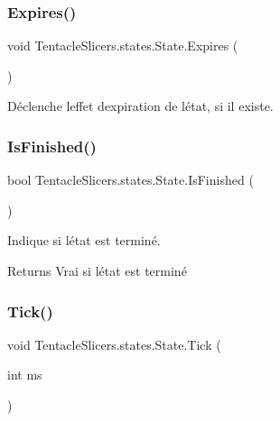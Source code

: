 \subsubsection{\texorpdfstring{Expires()}{Expires()}}
{\footnotesize\ttfamily void Tentacle\+Slicers.\+states.\+State.\+Expires (\begin{DoxyParamCaption}{ }\end{DoxyParamCaption})}



Déclenche l\textquotesingle{}effet d\textquotesingle{}expiration de l\textquotesingle{}état, si il existe. 

\mbox{\label{class_tentacle_slicers_1_1states_1_1_state_a07bdea4c02bbee510c5323157459226f}} 
\subsubsection{\texorpdfstring{Is\+Finished()}{IsFinished()}}
{\footnotesize\ttfamily bool Tentacle\+Slicers.\+states.\+State.\+Is\+Finished (\begin{DoxyParamCaption}{ }\end{DoxyParamCaption})}



Indique si l\textquotesingle{}état est terminé. 

\begin{DoxyReturn}{Returns}
Vrai si l\textquotesingle{}état est terminé 
\end{DoxyReturn}
\mbox{\label{class_tentacle_slicers_1_1states_1_1_state_a0196a4dcb4894e5d0de3387bc9cfcf26}} 
\subsubsection{\texorpdfstring{Tick()}{Tick()}}
{\footnotesize\ttfamily void Tentacle\+Slicers.\+states.\+State.\+Tick (\begin{DoxyParamCaption}\item[{int}]{ms }\end{DoxyParamCaption})}




